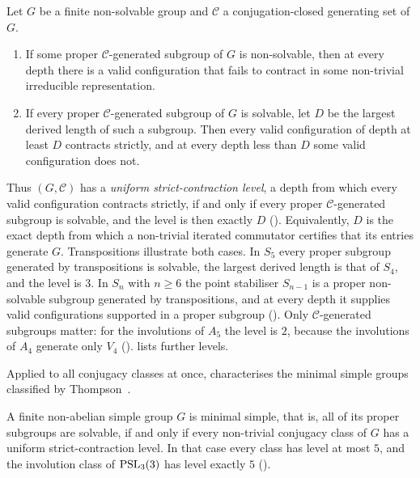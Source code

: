 \begin{lettertheorem}
\label{ithm:A}
Let $G$ be a finite non-solvable group and $\mathcal C$ a
conjugation-closed generating set of $G$.
\begin{enumerate}[nosep,leftmargin=1.9em,label=\textup{(\arabic*)}]
\item If some proper $\mathcal C$-generated subgroup of $G$ is
non-solvable, then at every depth there is a valid configuration that
fails to contract in some non-trivial irreducible representation.
\item If every proper $\mathcal C$-generated subgroup of $G$ is solvable,
let $D$ be the largest derived length of such a subgroup. Then every
valid configuration of depth at least $D$ contracts strictly, and at
every depth less than $D$ some valid configuration does not.
\end{enumerate}
\end{lettertheorem}

Thus $(G,\mathcal C)$ has a \emph{uniform strict-contraction level}, a
depth from which every valid configuration contracts strictly, if and
only if every proper $\mathcal C$-generated subgroup is solvable, and
the level is then exactly $D$ (). Equivalently, $D$
is the exact depth from which a non-trivial iterated commutator certifies
that its entries generate $G$. Transpositions illustrate both cases. In
$S_5$ every proper subgroup generated by transpositions is solvable, the
largest derived length is that of $S_4$, and the level is $3$. In $S_n$
with $n\ge6$ the point stabiliser $S_{n-1}$ is a proper non-solvable
subgroup generated by transpositions, and at every depth it supplies
valid configurations supported in a proper subgroup ().
Only $\mathcal C$-generated subgroups matter: for the involutions of
$A_5$ the level is $2$, because the involutions of $A_4$ generate only
$V_4$ ().  lists further levels.

Applied to all conjugacy classes at once,  characterises
the minimal simple groups classified by Thompson~\cite{Thompson1968}.

\begin{corollary}
\label{icor:minsimple}
A finite non-abelian simple group $G$ is minimal simple, that is, all of
its proper subgroups are solvable, if and only if every non-trivial
conjugacy class of $G$ has a uniform strict-contraction level. In that
case every class has level at most $5$, and the involution class of
$\operatorname{PSL}_3(3)$ has level exactly $5$
\textup{()}.
\end{corollary}

